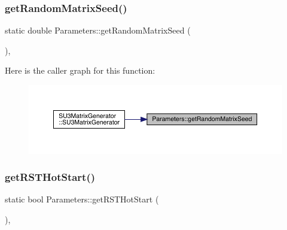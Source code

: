 \mbox{\label{class_parameters_a92d9e73e333b01745747e55d9ae4f7cc}} 
\subsubsection{\texorpdfstring{getRandomMatrixSeed()}{getRandomMatrixSeed()}}
{\footnotesize\ttfamily static double Parameters\+::get\+Random\+Matrix\+Seed (\begin{DoxyParamCaption}{ }\end{DoxyParamCaption})\hspace{0.3cm}{\ttfamily [inline]}, {\ttfamily [static]}}

Here is the caller graph for this function\+:
\nopagebreak
\begin{figure}[H]
\begin{center}
\leavevmode
\includegraphics[width=350pt]{class_parameters_a92d9e73e333b01745747e55d9ae4f7cc_icgraph}
\end{center}
\end{figure}
\mbox{\label{class_parameters_a4c24cb57765589a12eae030894423735}} 
\subsubsection{\texorpdfstring{getRSTHotStart()}{getRSTHotStart()}}
{\footnotesize\ttfamily static bool Parameters\+::get\+R\+S\+T\+Hot\+Start (\begin{DoxyParamCaption}{ }\end{DoxyParamCaption})\hspace{0.3cm}{\ttfamily [inline]}, {\ttfamily [static]}}

